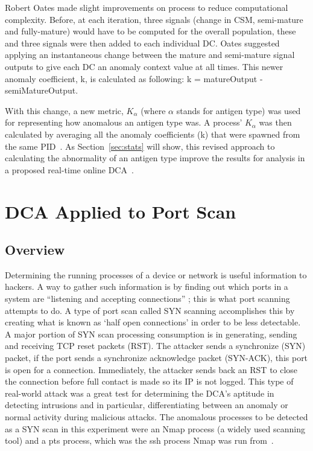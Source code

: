 \documentclass{umm-senior-sem}
\begin{document}
Robert Oates made slight improvements on process to reduce computational complexity. Before, at each iteration, three signals (change in CSM, semi-mature and fully-mature) would have to be computed for the overall population, these and three signals were then added to each individual DC. Oates suggested applying an instantaneous change between the mature and semi-mature signal outputs to give each DC an anomaly context value at all times. This newer anomaly coefficient, k, is calculated as following: \textsf{k = matureOutput - semiMatureOutput}. 

With this change, a new metric, $K_\alpha$ (where $\alpha$ stands for antigen type) was used for representing how anomalous an antigen type was. A process' $K_\alpha$ was then calculated by averaging all the anomaly coefficients (k) that were spawned from the same PID~\cite{signalCalculationImprovements:2008}.
As Section~\ref{sec:stats} will show, this revised approach to calculating the abnormality of an antigen type improve the results for analysis in a proposed real-time online DCA~\cite{guSeg:2011}.

\section{DCA Applied to Port Scan}
\label{sec:DCA Applied to Port Scan}
\subsection{Overview}
Determining the running processes of a device or network is useful information to hackers. A way to gather such information is by finding out which ports in a system are ``listening and accepting connections'' \cite{greensmith_thesis:2007}; this is what port scanning attempts to do. A type of port scan called SYN scanning accomplishes this by creating what is known as `half open connections' in order to be less detectable. A major portion of SYN scan processing consumption is in generating, sending and receiving TCP reset packets (RST). The attacker sends a synchronize (SYN) packet, if the port sends a synchronize acknowledge packet (SYN-ACK), this port is open for a connection. Immediately, the attacker sends back an RST to close the connection before full contact is made so its IP is not logged. This type of real-world attack was a great test for determining the DCA's aptitude in detecting intrusions and in particular, differentiating between an anomaly or normal activity during malicious attacks. The anomalous processes to be detected as a SYN scan in this experiment were an Nmap process (a widely used scanning tool) and a pts process, which was the ssh process Nmap was run from~\cite{greensmith_thesis:2007}.
\end{document}
